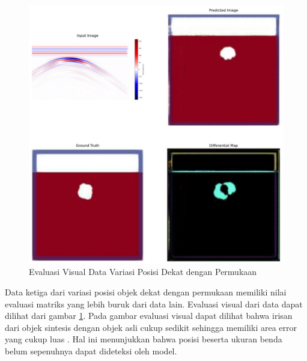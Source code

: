 \documentclass[conference]{IEEEtran}
\begin{document}
\begin{figure}[ht]
  \centering
  \includegraphics[scale=0.15]{gambar/diffMapDangkal.jpg}
  \caption{Evaluasi Visual Data Variasi Posisi Dekat dengan Permukaan}
  \label{fig:diffmapdangkal}
\end{figure}

Data ketiga dari variasi posisi objek dekat dengan permukaan memiliki nilai evaluasi matriks yang lebih buruk dari data lain. 
Evaluasi visual dari data dapat dilihat dari gambar \ref{fig:diffmapdangkal}. 
Pada gambar evaluasi visual dapat dilihat bahwa irisan dari objek sintesis dengan objek asli cukup sedikit sehingga memiliki area error yang cukup luas . 
Hal ini menunjukkan bahwa posisi beserta ukuran benda belum sepenuhnya dapat dideteksi oleh model.
\end{document}

